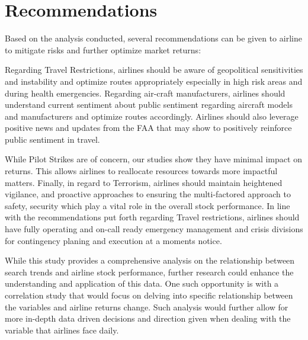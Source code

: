 \documentclass[12pt]{report}
\begin{document}
\section*{Recommendations}
Based on the analysis conducted, several recommendations can be given to airline to mitigate risks and further optimize market returns:

Regarding Travel Restrictions, airlines should be aware of geopolitical sensitivities and  instability and optimize routes appropriately especially in high risk areas and during health emergencies.
Regarding air-craft manufacturers, airlines should understand current sentiment about public sentiment  regarding aircraft models and manufacturers and optimize routes accordingly.
Airlines should also leverage positive news and updates from the FAA that may show to positively reinforce public sentiment in travel.

While Pilot Strikes are of concern, our studies show they have minimal impact on returns.
This allows airlines to reallocate resources towards more impactful matters.
Finally, in regard to Terrorism, airlines should maintain heightened vigilance, and proactive approaches to ensuring the multi-factored approach to safety, security which play a vital role in the overall stock performance.
In line with the recommendations put forth regarding Travel restrictions, airlines should have fully operating and on-call ready emergency management and crisis divisions for contingency planing and execution at a moments notice.

\par
While this study provides a comprehensive analysis on the relationship between search trends and airline stock performance, further research could enhance the understanding and application of this data.
One such opportunity is with a correlation study that would focus on delving into specific relationship between the variables and airline returns change.
Such analysis would further allow for more in-depth data driven decisions and direction given when dealing with the variable that airlines face daily.

\newpage



    
\end{document}
